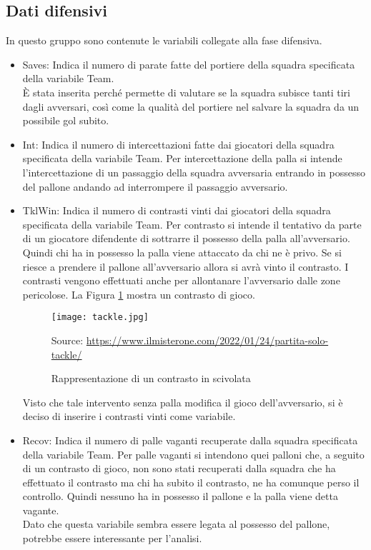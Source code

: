 \subsection{Dati difensivi}

In questo gruppo sono contenute le variabili collegate alla fase difensiva.

\begin{itemize}
	
	\item \textsf{Saves}: Indica il numero di parate fatte del portiere della squadra specificata della variabile \textsf{Team}. \\
	È stata inserita perché permette di valutare se la squadra subisce tanti tiri dagli avversari, così come la qualità del portiere nel salvare la squadra da un possibile gol subito.
	
	\item \textsf{Int}: Indica il numero di intercettazioni fatte dai giocatori della squadra specificata della variabile \textsf{Team}. Per intercettazione della palla si intende l'intercettazione di un passaggio della squadra avversaria entrando in possesso del pallone andando ad interrompere il passaggio avversario. 
	
	\item \textsf{TklWin}: Indica il numero di contrasti vinti dai giocatori della squadra specificata della variabile \textsf{Team}. Per contrasto si intende il tentativo da parte di un giocatore difendente di sottrarre il possesso della palla all'avversario. Quindi chi ha in possesso la palla viene attaccato da chi ne è privo. Se si riesce a prendere il pallone all'avversario allora si avrà vinto il contrasto. I contrasti vengono effettuati anche per allontanare l'avversario dalle zone pericolose. La Figura \ref{fig:tackle} mostra un contrasto di gioco.\\
	\begin{figure}[!ht]
		\begin{center}
			\texttt{[image: tackle.jpg]}
			\caption{Rappresentazione di un contrasto in scivolata}
			Source: \url{https://www.ilmisterone.com/2022/01/24/partita-solo-tackle/}
			\label{fig:tackle}
		\end{center}
	\end{figure}
	Visto che tale intervento senza palla modifica il gioco dell'avversario, si è deciso di inserire i contrasti vinti come variabile. 
	
	\item \textsf{Recov}: Indica il numero di palle vaganti recuperate dalla squadra specificata della variabile \textsf{Team}. Per palle vaganti si intendono quei palloni che, a seguito di un contrasto di gioco, non sono stati recuperati dalla squadra che ha effettuato il contrasto ma chi ha subito il contrasto, ne ha comunque perso il controllo. Quindi nessuno ha in possesso il pallone e la palla viene detta vagante.\\
	Dato che questa variabile sembra essere legata al possesso del pallone, potrebbe essere interessante per l'analisi.
	
	
\end{itemize}

